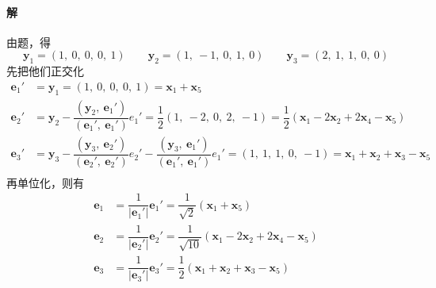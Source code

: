 \documentclass[12pt, a4paper, oneside, fontset=none]{ctexart}
\begin{document}
\paragraph*{解} 由题，得
\[
    \bm{y}_1 = (1,\ 0,\ 0,\ 0,\ 1) \qquad \bm{y}_2 = (1,\ -1,\ 0,\ 1,\ 0) \qquad \bm{y}_3 = (2,\ 1,\ 1,\ 0,\ 0)
\]
先把他们正交化
\begin{align*}
    \bm{e}_1' & = \bm{y}_1 = (1,\ 0,\ 0,\ 0,\ 1) = \bm{x}_1 + \bm{x}_5                                                                                                                                                      & \\
    \bm{e}_2' & = \bm{y}_2 -\dfrac{(\bm{y}_{2},\ \bm{e}_1')}{(\bm{e}_1',\ \bm{e}_1')}e_1' = \dfrac{1}{2}(1,\ -2,\ 0,\ 2,\ -1) = \dfrac{1}{2}(\bm{x}_1 - 2\bm{x}_2 + 2\bm{x}_4 - \bm{x}_5)                                   & \\
    \bm{e}_3' & = \bm{y}_3 -\dfrac{(\bm{y}_{3},\ \bm{e}_2')}{(\bm{e}_2',\ \bm{e}_2')}e_2' -\dfrac{(\bm{y}_{3},\ \bm{e}_1')}{(\bm{e}_1',\ \bm{e}_1')}e_1' = (1,\ 1,\ 1,\ 0,\ -1) = \bm{x}_1 + \bm{x}_2 + \bm{x}_3 - \bm{x}_5 & \\
\end{align*}
再单位化，则有
\begin{align*}
    \bm{e}_1 & = \dfrac{1}{|\bm{e}_1'|}\bm{e}_1' = \dfrac{1}{\sqrt{2}}(\bm{x}_1 + \bm{x}_5)                          \\
    \bm{e}_2 & = \dfrac{1}{|\bm{e}_2'|}\bm{e}_2' = \dfrac{1}{\sqrt{10}}(\bm{x}_1 - 2\bm{x}_2 + 2\bm{x}_4 - \bm{x}_5) \\
    \bm{e}_3 & = \dfrac{1}{|\bm{e}_3'|}\bm{e}_3' = \dfrac{1}{2}(\bm{x}_1 + \bm{x}_2 + \bm{x}_3 - \bm{x}_5)           \\
\end{align*}
\end{document}
